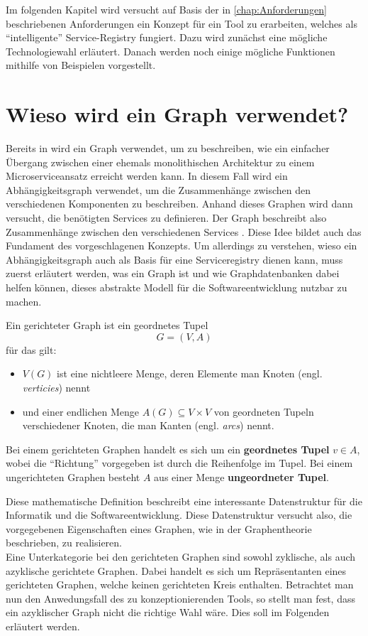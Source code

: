 \documentclass[
	12pt,
	BCOR=5mm,
	DIV=12,
	headinclude=on,
	footinclude=off,
	parskip=half,
	bibliography=totoc,
	listof=entryprefix,
	toc=listof,
	numbers=noenddot,
	plainfootsepline
]{scrreprt}
\begin{document}
Im folgenden Kapitel wird versucht auf Basis der in \vref{chap:Anforderungen} beschriebenen Anforderungen ein Konzept für ein Tool zu erarbeiten, welches als \enquote{intelligente} Service-Registry fungiert. Dazu wird zunächst eine mögliche Technologiewahl erläutert. Danach werden noch einige mögliche Funktionen mithilfe von Beispielen vorgestellt.

\section{Wieso wird ein Graph verwendet?}

Bereits in \citeauthor{Ren2018} wird ein Graph verwendet, um zu beschreiben, wie ein einfacher Übergang zwischen einer ehemals monolithischen Architektur zu einem Microserviceansatz erreicht werden kann. In diesem Fall wird ein Abhängigkeitsgraph verwendet, um die Zusammenhänge zwischen den verschiedenen Komponenten zu beschreiben. Anhand dieses Graphen wird dann versucht, die benötigten Services zu definieren. Der Graph beschreibt also Zusammenhänge zwischen den verschiedenen Services \autocite[Kapitel 3.2 \& Kapitel 3.3]{Ren2018}. Diese Idee bildet auch das Fundament des vorgeschlagenen Konzepts. Um allerdings zu verstehen, wieso ein Abhängigkeitsgraph auch als Basis für eine Serviceregistry dienen kann, muss zuerst erläutert werden, was ein Graph ist und wie Graphdatenbanken dabei helfen können, dieses abstrakte Modell für die Softwareentwicklung nutzbar zu machen.

\begin{definition}\autocite[Kapitel 1.2]{Bang-Jensen2007}
	Ein gerichteter Graph ist ein geordnetes Tupel $$G = (V,A)$$ für das gilt:
	\begin{itemize}
		\item $V(G)$ ist eine nichtleere Menge, deren Elemente man Knoten (engl. \textit{verticies}) nennt
		\item und einer endlichen Menge $A(G) \subseteq V \times V$ von geordneten Tupeln verschiedener Knoten, die man Kanten (engl. \textit{arcs}) nennt.
	\end{itemize}

	Bei einem gerichteten Graphen handelt es sich um ein \textbf{geordnetes Tupel} $v \in A$, wobei die \enquote{Richtung} vorgegeben ist durch die Reihenfolge im Tupel. Bei einem ungerichteten Graphen besteht $A$ aus einer Menge \textbf{ungeordneter Tupel}.
\end{definition}

Diese mathematische Definition beschreibt eine interessante Datenstruktur für die Informatik und die Softwareentwicklung. Diese Datenstruktur versucht also, die vorgegebenen Eigenschaften eines Graphen, wie in der Graphentheorie beschrieben, zu realisieren. \\
Eine Unterkategorie bei den gerichteten Graphen sind sowohl zyklische, als auch azyklische gerichtete Graphen. Dabei handelt es sich um Repräsentanten eines gerichteten Graphen, welche keinen gerichteten Kreis enthalten. Betrachtet man nun den Anwedungsfall des zu konzeptionierenden Tools, so stellt man fest, dass ein azyklischer Graph nicht die richtige Wahl wäre. Dies soll im Folgenden erläutert werden.
\end{document}
